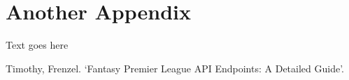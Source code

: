 \documentclass[12pt, a4paper,oneside]{book}
\numberwithin{equation}{section}
\begin{document}
\chapter{Another Appendix}

Text goes here




\begin{thebibliography}{999}




Timothy, Frenzel.
\newblock `Fantasy Premier League API Endpoints: A Detailed Guide'.



\end{thebibliography}
\end{document}
